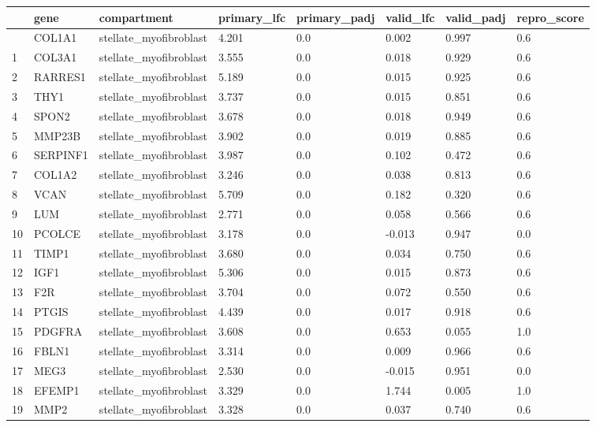\documentclass[
  letterpaper,
  DIV=11,
  numbers=noendperiod]{scrartcl}
\newcounter{none} %
\begin{document}
{\def\LTcaptype{none} %
\begin{longtable}[]{@{}llllllll@{}}
\toprule\noalign{}
& gene & compartment & primary\_lfc & primary\_padj & valid\_lfc &
valid\_padj & repro\_score \\
\midrule\noalign{}
\endhead
\bottomrule\noalign{}
\endlastfoot
0 & COL1A1 & stellate\_myofibroblast & 4.201 & 0.0 & 0.002 & 0.997 &
0.6 \\
1 & COL3A1 & stellate\_myofibroblast & 3.555 & 0.0 & 0.018 & 0.929 &
0.6 \\
2 & RARRES1 & stellate\_myofibroblast & 5.189 & 0.0 & 0.015 & 0.925 &
0.6 \\
3 & THY1 & stellate\_myofibroblast & 3.737 & 0.0 & 0.015 & 0.851 &
0.6 \\
4 & SPON2 & stellate\_myofibroblast & 3.678 & 0.0 & 0.018 & 0.949 &
0.6 \\
5 & MMP23B & stellate\_myofibroblast & 3.902 & 0.0 & 0.019 & 0.885 &
0.6 \\
6 & SERPINF1 & stellate\_myofibroblast & 3.987 & 0.0 & 0.102 & 0.472 &
0.6 \\
7 & COL1A2 & stellate\_myofibroblast & 3.246 & 0.0 & 0.038 & 0.813 &
0.6 \\
8 & VCAN & stellate\_myofibroblast & 5.709 & 0.0 & 0.182 & 0.320 &
0.6 \\
9 & LUM & stellate\_myofibroblast & 2.771 & 0.0 & 0.058 & 0.566 & 0.6 \\
10 & PCOLCE & stellate\_myofibroblast & 3.178 & 0.0 & -0.013 & 0.947 &
0.0 \\
11 & TIMP1 & stellate\_myofibroblast & 3.680 & 0.0 & 0.034 & 0.750 &
0.6 \\
12 & IGF1 & stellate\_myofibroblast & 5.306 & 0.0 & 0.015 & 0.873 &
0.6 \\
13 & F2R & stellate\_myofibroblast & 3.704 & 0.0 & 0.072 & 0.550 &
0.6 \\
14 & PTGIS & stellate\_myofibroblast & 4.439 & 0.0 & 0.017 & 0.918 &
0.6 \\
15 & PDGFRA & stellate\_myofibroblast & 3.608 & 0.0 & 0.653 & 0.055 &
1.0 \\
16 & FBLN1 & stellate\_myofibroblast & 3.314 & 0.0 & 0.009 & 0.966 &
0.6 \\
17 & MEG3 & stellate\_myofibroblast & 2.530 & 0.0 & -0.015 & 0.951 &
0.0 \\
18 & EFEMP1 & stellate\_myofibroblast & 3.329 & 0.0 & 1.744 & 0.005 &
1.0 \\
19 & MMP2 & stellate\_myofibroblast & 3.328 & 0.0 & 0.037 & 0.740 &
0.6 \\
\end{longtable}
}
\end{document}
